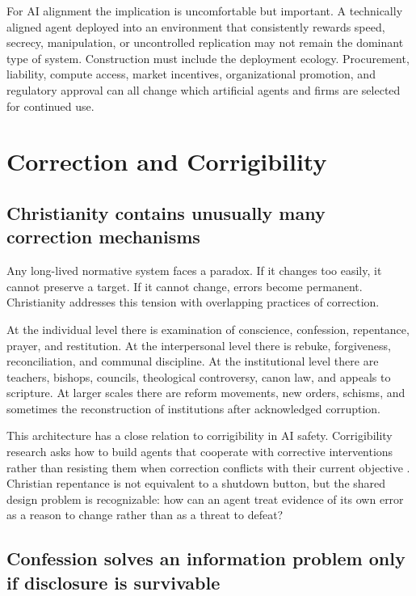 \documentclass[11pt]{article}
\begin{document}
For AI alignment the implication is uncomfortable but important. A technically aligned agent deployed into an environment that consistently rewards speed, secrecy, manipulation, or uncontrolled replication may not remain the dominant type of system. Construction must include the deployment ecology. Procurement, liability, compute access, market incentives, organizational promotion, and regulatory approval can all change which artificial agents and firms are selected for continued use.

\section{Correction and Corrigibility}

\subsection{Christianity contains unusually many correction mechanisms}

Any long-lived normative system faces a paradox. If it changes too easily, it cannot preserve a target. If it cannot change, errors become permanent. Christianity addresses this tension with overlapping practices of correction.

At the individual level there is examination of conscience, confession, repentance, prayer, and restitution. At the interpersonal level there is rebuke, forgiveness, reconciliation, and communal discipline. At the institutional level there are teachers, bishops, councils, theological controversy, canon law, and appeals to scripture. At larger scales there are reform movements, new orders, schisms, and sometimes the reconstruction of institutions after acknowledged corruption.

This architecture has a close relation to corrigibility in AI safety. Corrigibility research asks how to build agents that cooperate with corrective interventions rather than resisting them when correction conflicts with their current objective \parencite{soares2015corrigibility}. Christian repentance is not equivalent to a shutdown button, but the shared design problem is recognizable: how can an agent treat evidence of its own error as a reason to change rather than as a threat to defeat?

\subsection{Confession solves an information problem only if disclosure is survivable}
\end{document}
